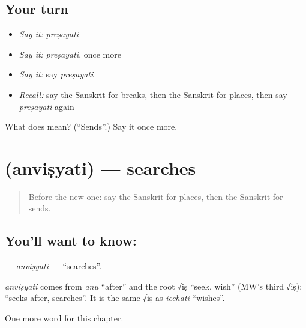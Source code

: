 \subsection*{Your turn}
\begin{itemize}
\raggedright
  \item \emph{Say it:} \emph{preṣayati}
  \item \emph{Say it:} \emph{preṣayati}, once more
  \item \emph{Say it:} say \emph{preṣayati}
  \item \emph{Recall:} say the Sanskrit for breaks, then the Sanskrit for places, then say \emph{preṣayati} again
\end{itemize}

\begin{tcolorbox}[breakable,colback=teal!4,colframe=teal!35!black,title={Before you move on}]
What does  mean? (\textquotedblleft{}Sends\textquotedblright{}.) Say it once more.
\end{tcolorbox}
\section[\texorpdfstring{\sk{अन्विष्यति} (anviṣyati)}{अन्विष्यति (anviṣyati)}]{ (anviṣyati) — searches}

\label{lesson:SA-C134-anvisyati}



\begin{quote}
Before the new one: say the Sanskrit for places, then the Sanskrit for sends.
\end{quote}

\subsection*{You'll want to know: }
\textbf{} — \emph{anviṣyati} — \textquotedblleft{}searches\textquotedblright{}.

\begin{cousinweb}
\emph{anviṣyati} comes from \emph{anu} \textquotedblleft{}after\textquotedblright{} and the root √iṣ \textquotedblleft{}seek, wish\textquotedblright{} (MW's third √iṣ): \textquotedblleft{}seeks after, searches\textquotedblright{}. It is the same √iṣ as \emph{icchati} \textquotedblleft{}wishes\textquotedblright{}.
\end{cousinweb}

\begin{grammarlens}[title={What you've built}]
One more word for this chapter.
\end{grammarlens}

